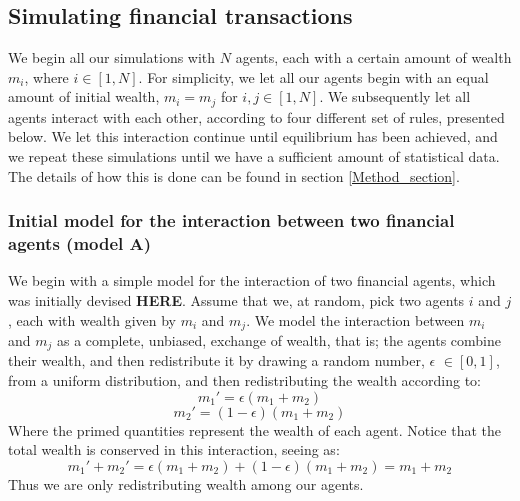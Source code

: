 \documentclass[a4paper, 10pt]{article}
\begin{document}
\subsection{Simulating financial transactions}
We begin all our simulations with $N$ agents, each with a certain amount of wealth $m_i$, where $i \in [1, N]$.  For simplicity, we let all our agents begin with an equal amount of initial wealth, $m_i=m_j$ for $i,j \in [1,N]$. We subsequently let all agents interact with each other, according to four different set of rules, presented below. We let this interaction continue until equilibrium has been achieved, and we repeat these simulations until we have a sufficient amount of statistical data. The details of how this is done can be found in section \ref{Method_section}.
\subsubsection{Initial model for the interaction between two financial agents (model A)}\label{Initial_model}
We begin with a simple model for the interaction of two financial agents, which was initially devised \textbf{HERE}. Assume that we, at random, pick two agents $i$ and $j$, each with wealth given by $m_i$ and $m_j$. We model the interaction between $m_i$ and $m_j$ as a complete, unbiased, exchange of wealth, that is; the agents combine their wealth, and then redistribute it by drawing a random number, $\epsilon$ $\in [0,1]$, from a uniform distribution, and then redistributing the wealth according to:
\begin{equation}
m_1'=\epsilon(m_1+m_2)
\end{equation}
\begin{equation}
m_2'=(1-\epsilon)(m_1+m_2)
\end{equation}
Where the primed quantities represent the wealth of each agent. Notice that the total wealth is conserved in this interaction, seeing as:
$$m_1'+m_2'=\epsilon(m_1+m_2)+(1-\epsilon)(m_1+m_2)=m_1+m_2$$
Thus we are only redistributing wealth among our agents.
\end{document}
